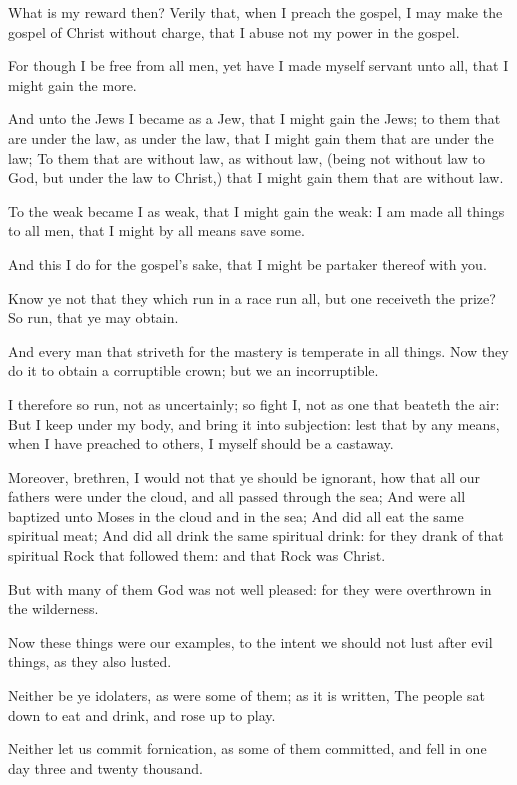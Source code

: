 \Verse What is my reward then? Verily that, when I preach the gospel, I may make the gospel of Christ without charge, that I abuse not my power in the gospel.

\Verse For though I be free from all men, yet have I made myself servant unto all, that I might gain the more.

\Verse And unto the Jews I became as a Jew, that I might gain the Jews; to them that are under the law, as under the law, that I might gain them that are under the law; \Verse To them that are without law, as without law, (being not without law to God, but under the law to Christ,) that I might gain them that are without law.

\Verse To the weak became I as weak, that I might gain the weak: I am made all things to all men, that I might by all means save some.

\Verse And this I do for the gospel's sake, that I might be partaker thereof with you.

\Verse Know ye not that they which run in a race run all, but one receiveth the prize? So run, that ye may obtain.

\Verse And every man that striveth for the mastery is temperate in all things. Now they do it to obtain a corruptible crown; but we an incorruptible.

\Verse I therefore so run, not as uncertainly; so fight I, not as one that beateth the air: \Verse But I keep under my body, and bring it into subjection: lest that by any means, when I have preached to others, I myself should be a castaway.


\Chapter
\Verse Moreover, brethren, I would not that ye should be ignorant, how that all our fathers were under the cloud, and all passed through the sea; \Verse And were all baptized unto Moses in the cloud and in the sea; \Verse And did all eat the same spiritual meat; \Verse And did all drink the same spiritual drink: for they drank of that spiritual Rock that followed them: and that Rock was Christ.

\Verse But with many of them God was not well pleased: for they were overthrown in the wilderness.

\Verse Now these things were our examples, to the intent we should not lust after evil things, as they also lusted.

\Verse Neither be ye idolaters, as were some of them; as it is written, The people sat down to eat and drink, and rose up to play.

\Verse Neither let us commit fornication, as some of them committed, and fell in one day three and twenty thousand.

